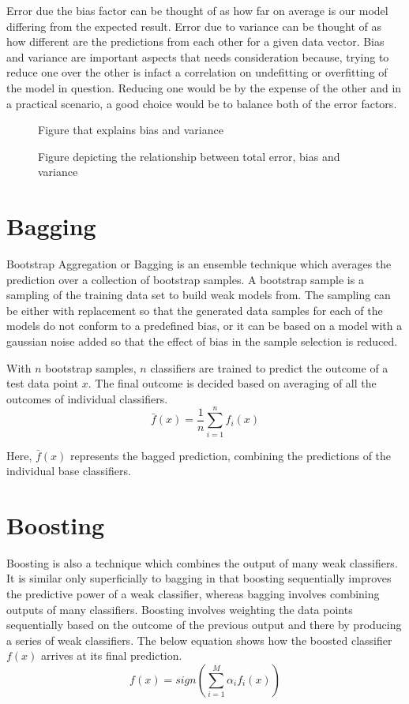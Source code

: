 \documentclass{acmtog} %
\begin{document}
Error due the bias factor can be thought of as how far on average is our model differing from the expected result. Error due to variance can be thought of as how different are the predictions from each other for a given data vector. Bias and variance are important aspects that needs consideration because, trying to reduce one over the other is infact a correlation on undefitting or overfitting of the model in question. Reducing one would be by the expense of the other and in a practical scenario, a good choice would be to balance both of the error factors. 
\begin{figure}
	\centering
	\def\svgwidth{\columnwidth}
	
	\caption{Figure that explains bias and variance}
\end{figure}
\begin{figure}
	\centering
	\def\svgwidth{\columnwidth}
	
	\caption{Figure depicting the relationship between total error, bias and variance}
\end{figure}
\section{Bagging}
Bootstrap Aggregation or Bagging is an ensemble technique which averages the prediction over a collection of bootstrap samples. A bootstrap sample is a sampling of the training data set to build weak models from. The sampling can be either with replacement so that the generated data samples for each of the models do not conform to a predefined bias, or it can be based on a model with a gaussian noise added so that the effect of bias in the sample selection is reduced.

With $n$ bootstrap samples, $n$ classifiers are trained to predict the outcome of a test data point $x$. The final outcome is decided based on averaging of all the outcomes of individual classifiers.
\begin{equation}
	\bar{f}(x) = \frac{1}{n}\sum^n_{i=1} f_i(x)
\label{eq:baggingEq}
\end{equation}

Here, $\bar{f}(x)$ represents the bagged prediction, combining the predictions of the individual base classifiers.

\section{Boosting}
Boosting is also a technique which combines the output of many weak classifiers. It is similar only superficially to bagging in that boosting sequentially improves the predictive power of a weak classifier, whereas bagging involves combining outputs of many classifiers. Boosting involves weighting the data points sequentially based on the outcome of the previous output and there by producing a series of weak classifiers.
The below equation shows how the boosted classifier $f(x)$ arrives at its final prediction.
\begin{equation}
	f(x) = sign(\sum^M_{i=1} \alpha _i f_i(x))
\label{eq:boostingEq}
\end{equation}
\end{document}
